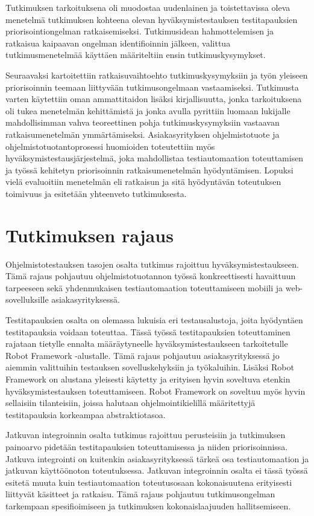  Tutkimuksen tarkoituksena oli muodostaa uudenlainen ja toistettavissa oleva menetelmä tutkimuksen kohteena olevan hyväksymistestauksen testitapauksien priorisointiongelman ratkaisemiseksi.
  Tutkimusidean hahmottelemisen ja ratkaisua kaipaavan ongelman identifioinnin jälkeen, valittua tutkimusmenetelmää käyttäen määriteltiin ensin tutkimuskysymykset.

  Seuraavaksi kartoitettiin ratkaisuvaihtoehto tutkimuskysymyksiin ja työn yleiseen priorisoinnin teemaan liittyvään tutkimusongelmaan vastaamiseksi.
  Tutkimusta varten käytettiin oman ammattitaidon lisäksi kirjallisuutta, jonka tarkoituksena oli tukea menetelmän kehittämistä ja jonka avulla pyrittiin luomaan lukijalle mahdollisimman vahva teoreettinen pohja tutkimuskysymyksiin vastaavan ratkaisumenetelmän ymmärtämiseksi.
  Asiakasyrityksen ohjelmistotuote ja ohjelmistotuotantoprosessi huomioiden toteutettiin myös hyväksymistestausjärjestelmä, joka mahdollistaa testiautomaation toteuttamisen ja työssä kehitetyn priorisoinnin ratkaisumenetelmän hyödyntämisen.
  Lopuksi vielä evaluoitiin menetelmän eli ratkaisun ja sitä hyödyntävän toteutuksen toimivuus ja esitetään yhteenveto tutkimuksesta.

\section{Tutkimuksen rajaus} \label{ch:06_tutkimuksen_rajaus}

  Ohjelmistotestauksen tasojen osalta tutkimus rajoittuu hyväksymistestaukseen.
  Tämä rajaus pohjautuu ohjelmistotuotannon työssä konkreettisesti havaittuun tarpeeseen sekä yhdenmukaisen testiautomaation toteuttamiseen mobiili ja web-sovelluksille asiakasyrityksessä.

  Testitapauksien osalta on olemassa lukuisia eri testausalustoja, joita hyödyntäen testitapauksia voidaan toteuttaa.
  Tässä työssä testitapauksien toteuttaminen rajataan tietylle ennalta määräytyneelle hyväksymistestaukseen tarkoitetulle Robot Framework -alustalle.
  Tämä rajaus pohjautuu asiakasyrityksessä jo aiemmin valittuihin testauksen sovelluskehyksiin ja työkaluihin.
  Lisäksi Robot Framework on alustana yleisesti käytetty ja erityisen hyvin soveltuva etenkin hyväksymistestauksen toteuttamiseen.
  Robot Framework on soveltuu myös hyvin sellaisiin tilanteisiin, joissa halutaan ohjelmointikielillä määritettyjä testitapauksia korkeampaa abstraktiotasoa.

  Jatkuvan integroinnin osalta tutkimus rajoittuu perusteisiin ja tutkimuksen painoarvo pidetään testitapauksien toteuttamisessa ja niiden priorisoinnissa.
  Jatkuva integrointi on kuitenkin asiakasyrityksessä tärkeä osa testiautomaation ja jatkuvan käyttöönoton toteutuksessa.
  Jatkuvan integroinnin osalta ei tässä työssä esitetä muuta kuin testiautomaation toteutusosaan kokonaisuutena erityisesti liittyvät käsitteet ja ratkaisu.
  Tämä rajaus pohjautuu tutkimusongelman tarkempaan spesifioimiseen ja tutkimuksen kokonaislaajuuden hallitsemiseen.

